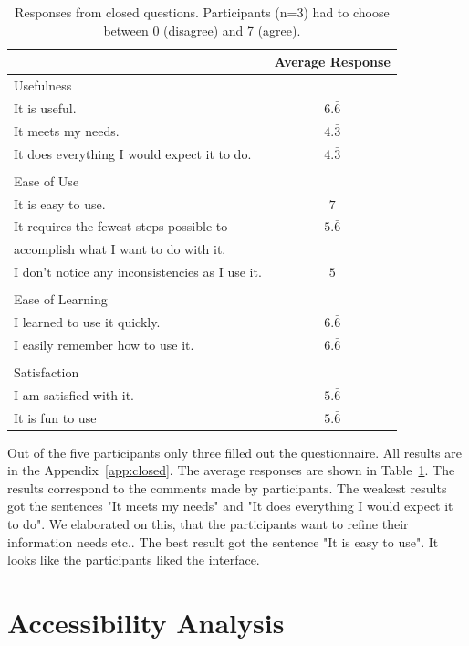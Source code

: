 \documentclass[11pt]{report}
\begin{document}
\begin{table}[h]
\caption{Responses from closed questions. Participants (n=3) had to choose between 0 (disagree) and 7 (agree). }
\label{table:closed}
\centering

\def\arraystretch{1.2}%
\begin{tabular}{ | l | c |}
\hline
& Average Response\\
\hline
\large{Usefulness}&\\
It is useful.&$6.\bar{6}$\\
It meets my needs.&$4.\bar{3}$\\
It does everything I would expect it to do.&$4.\bar{3}$\\
&\\
\large{Ease of Use}&\\
It is easy to use.&$7$\\
It requires the fewest steps possible to&$5.\bar{6}$\\
accomplish what I want to do with it.&\\
I don't notice any inconsistencies as I use it.&$5$\\
&\\
\large{Ease of Learning}&\\
I learned to use it quickly.&$6.\bar{6}$\\
I easily remember how to use it.&$6.\bar{6}$\\
&\\
\large{Satisfaction}&\\
I am satisfied with it.&$5.\bar{6}$\\
It is fun to use&$5.\bar{6}$\\

\hline

\end{tabular}
\end{table}

Out of the five participants only three filled out the questionnaire. All results are in the Appendix~\ref{app:closed}. The average responses are shown in Table~\ref{table:closed}. The results correspond to the comments made by participants. The weakest results got the sentences "It meets my needs" and "It does everything I would expect it to do". We elaborated on this, that the participants want to refine their information needs etc.. The best result got the sentence "It is easy to use". It looks like the participants liked the interface.
\section{Accessibility Analysis}
\end{document}
